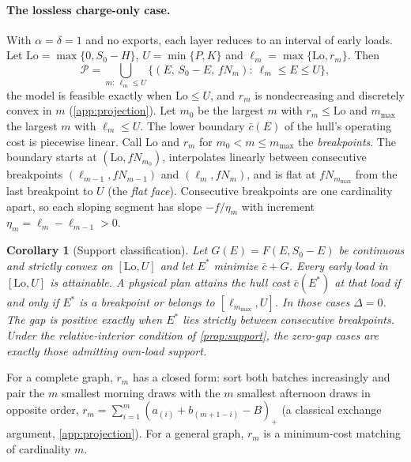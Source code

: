 \documentclass[11pt]{article}
\newtheorem{corollary}[theorem]{Corollary}
\theoremstyle{definition}\newtheorem{definition}[theorem]{Definition}
\theoremstyle{remark}\newtheorem{remark}[theorem]{Remark}
\begin{document}
\paragraph{The lossless charge-only case.}
With $\alpha=\delta=1$ and no exports, each layer reduces to an interval of early
loads. Let $\mathrm{Lo}=\max\{0,S_0-H\}$, $U=\min\{P,K\}$ and
$\ell_m=\max\{\mathrm{Lo},r_m\}$. Then
\begin{equation}\label{eq:lossless}
 \mathcal P=\bigcup_{m:\ \ell_m\le U}\{(E,\,S_0-E,\,fN_m):\ \ell_m\le E\le U\},
\end{equation}
the model is feasible exactly when $\mathrm{Lo}\le U$, and $r_m$ is nondecreasing and
discretely convex in $m$ (\cref{app:projection}). Let $m_0$ be the largest $m$
with $r_m\le\mathrm{Lo}$ and $m_{\max}$ the largest $m$ with $\ell_m\le U$. The
lower boundary $\bar c(E)$ of the hull's operating cost is piecewise linear. Call
$\mathrm{Lo}$ and $r_m$ for $m_0<m\le m_{\max}$ the \emph{breakpoints}. The boundary
starts at $(\mathrm{Lo},fN_{m_0})$, interpolates linearly between consecutive
breakpoints $(\ell_{m-1},fN_{m-1})$ and $(\ell_m,fN_m)$, and is flat at
$fN_{m_{\max}}$ from the last breakpoint to $U$ (the \emph{flat face}).
Consecutive breakpoints are one cardinality apart, so each sloping segment has slope
$-f/\eta_m$ with increment $\eta_m=\ell_m-\ell_{m-1}>0$.

\begin{corollary}[Support classification]\label{cor:support}
Let $G(E)=F(E,S_0-E)$ be continuous and strictly convex on $[\mathrm{Lo},U]$ and let
$E^*$ minimize $\bar c+G$. Every early load in $[\mathrm{Lo},U]$ is attainable.
A physical plan attains the hull cost $\bar c(E^*)$ at that load if and only if
$E^*$ is a breakpoint or belongs to $[\ell_{m_{\max}},U]$. In those cases
$\Delta=0$. The gap is positive exactly when $E^*$ lies strictly between
consecutive breakpoints. Under the relative-interior condition of
\cref{prop:support}, the zero-gap cases are exactly those admitting
own-load support.
\end{corollary}

For a complete graph, $r_m$ has a closed form: sort both batches
increasingly and pair the $m$ smallest morning draws with the $m$ smallest
afternoon draws in opposite order,
$r_m=\sum_{i=1}^m(a_{(i)}+b_{(m+1-i)}-B)_+$ (a classical exchange argument,
\cref{app:projection}). For a general graph, $r_m$ is a
minimum-cost matching of cardinality $m$.
\end{document}

